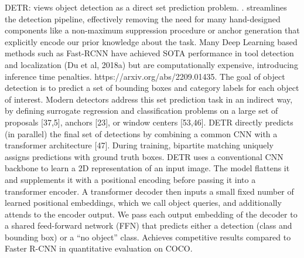 

DETR: views object detection as a direct set prediction problem. \cite{vedaldi_end--end_2020}. streamlines the detection pipeline, effectively removing the need for many hand-designed components like a non-maximum suppression procedure or anchor generation that explicitly encode our prior knowledge about the task.
Many Deep Learning based methods such as Fast-RCNN have achieved SOTA performance in tool detection and localization (Du et al, 2018a) but are computationally expensive, introducing inference time penalties. https://arxiv.org/abs/2209.01435.
The goal of object detection is to predict a set of bounding boxes and category labels for each object of interest. Modern detectors address this set prediction task in an indirect way, by defining surrogate regression and classification problems on a large set of proposals [37,5], anchors [23], or window centers [53,46].
DETR directly predicts (in parallel) the final set of detections by combining a common CNN with a transformer architecture [47]. During training, bipartite matching uniquely assigns predictions with ground truth boxes. 
DETR uses a conventional CNN backbone to learn a 2D representation of an input image. The model flattens it and supplements it with a positional encoding before passing it into a transformer encoder. A transformer decoder then inputs a small fixed number of learned positional embeddings, which we call object queries, and additionally attends to the encoder output. We pass each output embedding of the decoder to a shared feed-forward network (FFN) that predicts either a detection (class and bounding box) or a “no object” class.
Achieves competitive results compared to Faster R-CNN in quantitative evaluation on COCO.

